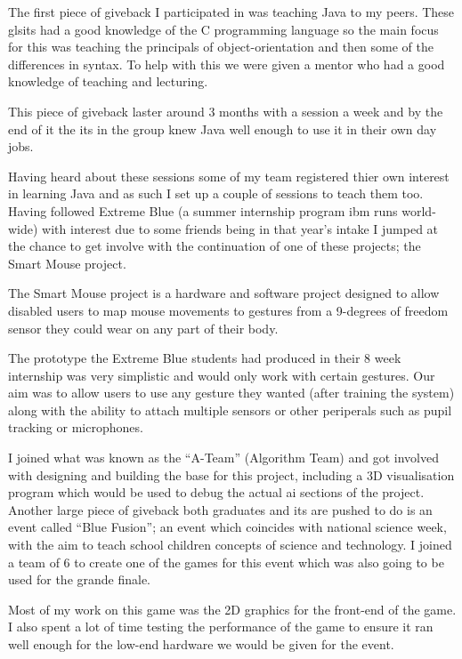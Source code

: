 \documentclass[a4paper,11pt]{report}
\begin{document}
The first piece of giveback I participated in was teaching Java to my peers. These gls{it}s had a
good knowledge of the C programming language so the main focus for this was teaching the principals
of object-orientation and then some of the differences in syntax. To help with this we were given a
mentor who had a good knowledge of teaching and lecturing.

This piece of giveback laster around 3 months with a session a week and by the end of it the 
\gls{it}s in the group knew Java well enough to use it in their own day jobs.

Having heard about these sessions some of my team registered thier own interest in learning Java
and as such I set up a couple of sessions to teach them too. \\



Having followed Extreme Blue (a summer internship program \gls{ibm} runs world-wide) with interest
due to some friends being in that year's intake I jumped at the chance to get involve with the 
continuation of one of these projects; the Smart Mouse project.

The Smart Mouse project is a hardware and software project designed to allow disabled users to map
mouse movements to gestures from a 9-degrees of freedom sensor they could wear on any part of their
body.

The prototype the Extreme Blue students had produced in their 8 week internship was very simplistic
and would only work with certain gestures. Our aim was to allow users to use any gesture they 
wanted (after training the system) along with the ability to attach multiple sensors or other
periperals such as pupil tracking or microphones.

I joined what was known as the ``A-Team'' (Algorithm Team) and got involved with designing and 
building the base for this project, including a 3D visualisation program which would be used to 
debug the actual \gls{ai} sections of the project. \\



Another large piece of giveback both graduates and \gls{it}s are pushed to do is an event called
``Blue Fusion''; an event which coincides with national science week, with the aim to teach school
children concepts of science and technology. I joined a team of 6 to create one of the games for
this event which was also going to be used for the grande finale.

Most of my work on this game was the 2D graphics for the front-end of the game. I also spent a lot
of time testing the performance of the game to ensure it ran well enough for the low-end hardware
we would be given for the event.
\end{document}
